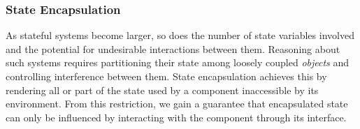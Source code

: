 \documentclass[acmsmall,screen,review,anonymous]{acmart}
\begin{document}

\subsubsection{State Encapsulation} \label{sec:req:encap} %

As stateful systems become larger,
so does the number of state variables involved
and the potential for undesirable interactions between them.
Reasoning about such systems
requires partitioning their state
among loosely coupled \emph{objects}
and controlling interference between them.
%
State encapsulation achieves this by rendering
all or part of the state used by a component
inaccessible by its environment.
From this restriction,
we gain a guarantee that
encapsulated state can only be influenced
by interacting with the component through its interface.


\end{document}
